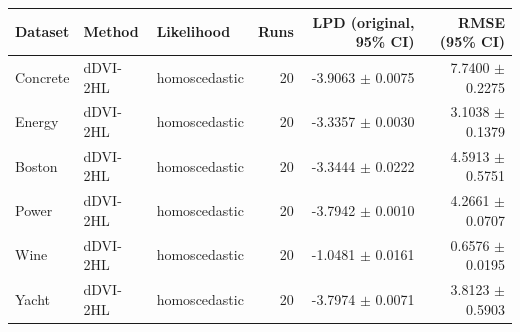 \begin{tabular}{lllrrr}
\toprule
Dataset & Method & Likelihood & Runs & LPD (original, 95\% CI) & RMSE (95\% CI) \\
\midrule
Concrete & dDVI-2HL & homoscedastic & 20 & -3.9063 $\pm$ 0.0075 & 7.7400 $\pm$ 0.2275 \\
Energy & dDVI-2HL & homoscedastic & 20 & -3.3357 $\pm$ 0.0030 & 3.1038 $\pm$ 0.1379 \\
Boston & dDVI-2HL & homoscedastic & 20 & -3.3444 $\pm$ 0.0222 & 4.5913 $\pm$ 0.5751 \\
Power & dDVI-2HL & homoscedastic & 20 & -3.7942 $\pm$ 0.0010 & 4.2661 $\pm$ 0.0707 \\
Wine & dDVI-2HL & homoscedastic & 20 & -1.0481 $\pm$ 0.0161 & 0.6576 $\pm$ 0.0195 \\
Yacht & dDVI-2HL & homoscedastic & 20 & -3.7974 $\pm$ 0.0071 & 3.8123 $\pm$ 0.5903 \\
\bottomrule
\end{tabular}
